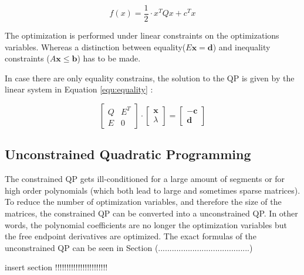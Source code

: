 \begin{equation}
 f(x)  = \frac{1}{2} \cdot x^T Q x + c^T x 
\label{equ:quadratic}
\end{equation}

The optimization is performed under linear constraints on the optimizations variables. Whereas a distinction between equality($ E\mathbf{x} = \mathbf d $) and inequality constraints ($ A\mathbf{x} \leq \mathbf b $) has to be made. 

In case there are only equality constrains, the solution to the QP is given by the linear system in Equation \ref{equ:equality} :


\begin{equation}
\begin{bmatrix}
   Q & E^T \\
   E & 0
\end{bmatrix} 
\cdot
\begin{bmatrix}
   \mathbf x \\
   \lambda
\end{bmatrix}
= 
\begin{bmatrix}
   -\mathbf c \\
   \mathbf d
\end{bmatrix}
\label{equ:equality}
\end{equation}



\subsection{Unconstrained Quadratic Programming}
The constrained QP gets ill-conditioned for a large amount of segments or for high order polynomials (which both lead to large and sometimes sparse matrices). 
To reduce the number of optimization variables, and therefore the size of the matrices, the constrained QP can be converted into a unconstrained QP. \newline
In other words, the polynomial coefficients are no longer the optimization variables but the free endpoint derivatives are optimized. The exact formulas of the unconstrained QP can be seen in Section (........................................) \newline

insert section !!!!!!!!!!!!!!!!!!!!!!!








